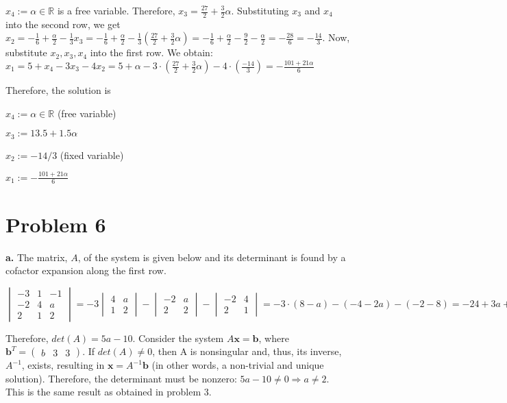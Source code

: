 \documentclass{article}
\begin{document}
$x_{4} := \alpha \in \mathbb{R}$ is a free variable. Therefore, $x_{3} = \frac{27}{2} + \frac{3}{2}\alpha$. Substituting $x_{3}$ and $x_{4}$ into the second row, we get $x_{2} = -\frac{1}{6} + \frac{\alpha}{2} - \frac{1}{3} x_{3} = -\frac{1}{6} + \frac{\alpha}{2} - \frac{1}{3} (\frac{27}{2} + \frac{3}{2}\alpha) = -\frac{1}{6} + \frac{\alpha}{2} - \frac{9}{2} - \frac{\alpha}{2} = -\frac{28}{6} = -\frac{14}{3}$. Now, substitute $x_{2}, x_{3}, x_{4}$ into the first row. We obtain: $x_{1} = 5 + x_{4} - 3x_{3} - 4x_{2} = 5 + \alpha - 3 \cdot ( \frac{27}{2} + \frac{3}{2}\alpha) - 4 \cdot \left( \frac{-14}{3} \right) = -\frac{101 + 21\alpha}{6}$

Therefore, the solution is

$x_{4} := \alpha \in \mathbb{R}$ (free variable)

$x_{3} := 13.5 + 1.5\alpha$

$x_{2} := -14/3$ (fixed variable)

$x_{1} := -\frac{101 + 21\alpha}{6}$

\section{Problem 6}

\textbf{a.} The matrix, $A$, of the system is given below and its determinant is found by a cofactor expansion along the first row.

\begin{equation*}
  \begin{vmatrix}
    -3 & 1 & -1 \\
    -2 & 4 & a  \\
    2 & 1 & 2 
  \end{vmatrix} =
  -3
  \begin{vmatrix}
    4 & a \\
    1 & 2
  \end{vmatrix}
  -\begin{vmatrix}
    -2 & a \\
    2 & 2
  \end{vmatrix}
  - \begin{vmatrix}
    -2 & 4 \\
    2 & 1
    \end{vmatrix} = -3 \cdot (8 - a) - (-4 - 2a) - (-2 - 8) = -24 + 3a + 4 + 2a + 2 + 8 = 5a - 10
\end{equation*}

Therefore, $det(A) = 5a - 10$. Consider the system $A\mathbf{x} = \mathbf{b} $, where $\mathbf{b}^{T} = \begin{pmatrix} b & 3 & 3 \end{pmatrix}$. If $det(A) \ne 0$, then A is nonsingular and, thus, its inverse, $A^{-1}$, exists, resulting in $\mathbf{x} = A^{-1}\mathbf{b}$ (in other words, a non-trivial and unique solution). Therefore, the determinant must be nonzero: $5a - 10 \ne 0 \Rightarrow a \ne 2$. This is the same result as obtained in problem 3.
\end{document}
